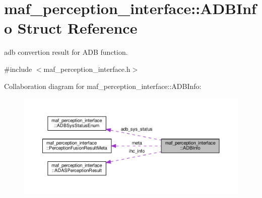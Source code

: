 \hypertarget{structmaf__perception__interface_1_1ADBInfo}{}\section{maf\+\_\+perception\+\_\+interface\+:\+:A\+D\+B\+Info Struct Reference}
\label{structmaf__perception__interface_1_1ADBInfo}


adb convertion result for A\+DB function.  




{\ttfamily \#include $<$maf\+\_\+perception\+\_\+interface.\+h$>$}



Collaboration diagram for maf\+\_\+perception\+\_\+interface\+:\+:A\+D\+B\+Info\+:\nopagebreak
\begin{figure}[H]
\begin{center}
\leavevmode
\includegraphics[width=350pt]{structmaf__perception__interface_1_1ADBInfo__coll__graph}
\end{center}
\end{figure}
